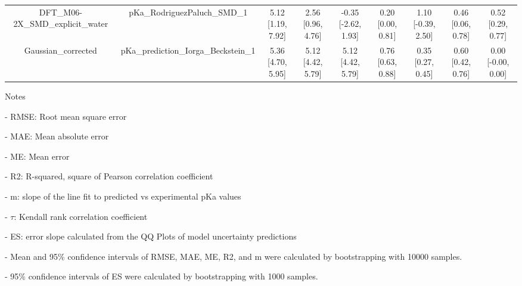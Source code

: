 \documentclass{article}
\begin{document}
\begin{center}
\begin{longtable}{|ccccccccc|}
 DFT_M06-2X_SMD_explicit_water &          pKa\_RodriguezPaluch\_SMD\_1 &  5.12 [1.19, 7.92] &  2.56 [0.96, 4.76] &  -0.35 [-2.62, 1.93] &  0.20 [0.00, 0.81] &    1.10 [-0.39, 2.50] &     0.46 [0.06, 0.78] &     0.52 [0.29, 0.77] \\
            Gaussian_corrected &  pKa\_prediction\_Iorga\_Beckstein\_1 &  5.36 [4.70, 5.95] &  5.12 [4.42, 5.79] &    5.12 [4.42, 5.79] &  0.76 [0.63, 0.88] &     0.35 [0.27, 0.45] &     0.60 [0.42, 0.76] &    0.00 [-0.00, 0.00] \\
\end{longtable}
\end{center}

Notes

- RMSE: Root mean square error

- MAE: Mean absolute error

- ME: Mean error

- R2: R-squared, square of Pearson correlation coefficient

- m: slope of the line fit to predicted vs experimental pKa values

- $\tau$:  Kendall rank correlation coefficient

- ES: error slope calculated from the QQ Plots of model uncertainty predictions

- Mean and 95\% confidence intervals of RMSE, MAE, ME, R2, and m were calculated by bootstrapping with 10000 samples.

- 95\% confidence intervals of ES were calculated by bootstrapping with 1000 samples.\end{document}
\end{document}
